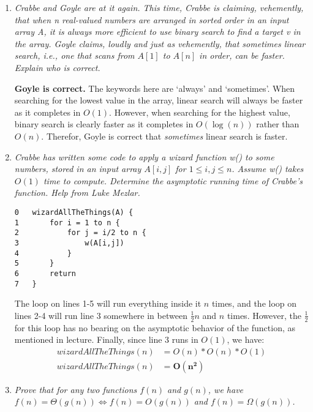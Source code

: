 \documentclass[12pt]{article}
\begin{document}
\begin{enumerate}
    \newpage
    \item \textit{Crabbe and Goyle are at it again. This time, Crabbe is claiming, vehemently, that when n real-valued numbers are arranged in sorted order in an input array A, it is always more efficient to use binary search to 
find a target v in the array. Goyle claims, loudly and just as vehemently, that sometimes linear search, i.e., one that scans from $A[1]$ to $A[n]$ in order, can be faster. Explain who is correct.}
	
    \textbf{Goyle is correct.} The keywords here are `always' and `sometimes'. When searching for the lowest value in the array, linear search will always be faster as it completes in $O(1)$. However, when searching for the highest 
value, binary search is clearly faster as it completes in $O(\log(n))$ rather than $O(n)$. Therefor, Goyle is correct that \textit{sometimes} linear search is faster.
    
    \newpage
    \item \textit{Crabbe has written some code to apply a wizard function \textsl{w()} to some numbers, stored in an input array $A[i, j]$ for $1 \leq i, j \leq n$. Assume \textsl{w()} takes $O(1)$ time to compute. Determine the 
asymptotic running time of Crabbe's function. Help from Luke Mezlar.}
    
    \begin{verbatim}
0   wizardAllTheThings(A) {
1       for i = 1 to n {
2           for j = i/2 to n { 
3               w(A[i,j]) 
4           }
5       }
6       return
7   }
    \end{verbatim}
    The loop on lines 1-5 will run everything inside it $n$ times, and the loop on lines 2-4 will run line 3 somewhere in between $\frac{1}{2}n$ and $n$ times. However, the $\frac{1}{2}$ for this loop has no bearing on the 
asymptotic behavior of the function, as mentioned in lecture. Finally, since line 3 runs in $O(1)$, we have:
    \begin{align*}
    wizardAllTheThings(n) &= O(n) * O(n) * O(1) \\
    wizardAllTheThings(n) &= \mathbf{O(n^2)}
    \end{align*}
    
    
    \newpage
    \item \textit{Prove that for any two functions $f(n)$ and $g(n)$, we have $f(n)=\Theta(g(n)) \iff f(n) = O(g(n))$ and $f(n)=\Omega(g(n))$.}
	

\end{enumerate}
\end{document}
